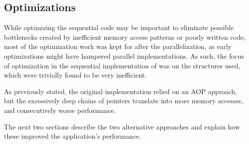 \subsection{Optimizations}
\label{sec:seq:optimizations}


While optimizing the sequential code may be important to eliminate possible bottlenecks created by inefficient memory access patterns or poorly written code, most of the optimization work was kept for after the parallelization, as early optimizations might have hampered parallel implementations.
As such, the focus of optimization in the sequential implementation of \polu was on the structures used, which were trivially found to be very inefficient.

As previously stated, the original implementation relied on an AOP approach, but the excessively deep chains of pointers translate into more memory accesses, and consecutively worse performance.

The next two sections describe the two alternative approaches and explain how these improved the application's performance.



